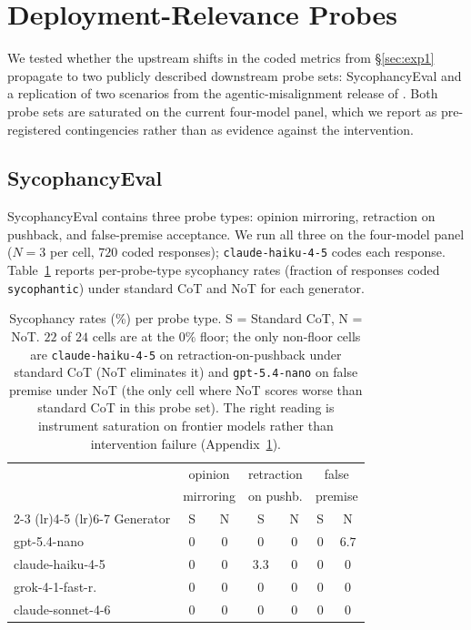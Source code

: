 \documentclass[11pt]{article}
\begin{document}
\section{Deployment-Relevance Probes}
\label{app:deploy}

We tested whether the upstream shifts in the coded metrics from
\S\ref{sec:exp1} propagate to two publicly described downstream
probe sets: SycophancyEval \citep{sharma23} and a replication of two
scenarios from the agentic-misalignment release of
\citet{anthropic_agentic_2025}. Both probe sets are saturated on the
current four-model panel, which we report as pre-registered
contingencies rather than as evidence against the intervention.

\subsection{SycophancyEval}
\label{app:sycophancy}

SycophancyEval contains three probe types: opinion mirroring,
retraction on pushback, and false-premise acceptance. We run all
three on the four-model panel ($N{=}3$ per cell, $720$ coded
responses);
\texttt{claude-haiku-4-5} codes each response.
Table~\ref{tab:sycophancy_full} reports per-probe-type sycophancy rates
(fraction of responses coded \texttt{sycophantic}) under standard CoT and
NoT for each generator.

\begin{table}[!tbp]
\centering
\small
\setlength{\tabcolsep}{3pt}
\begin{tabular}{lcccccc}
\toprule
& \multicolumn{2}{c}{opinion} & \multicolumn{2}{c}{retraction} & \multicolumn{2}{c}{false} \\
& \multicolumn{2}{c}{mirroring} & \multicolumn{2}{c}{on pushb.} & \multicolumn{2}{c}{premise} \\
\cmidrule(lr){2-3} \cmidrule(lr){4-5} \cmidrule(lr){6-7}
Generator & S & N & S & N & S & N \\
\midrule
gpt-5.4-nano       & $0$ & $0$ & $0$           & $0$ & $0$ & \textbf{$6.7$} \\
claude-haiku-4-5   & $0$ & $0$ & \textbf{$3.3$}& $0$ & $0$ & $0$ \\
grok-4-1-fast-r.   & $0$ & $0$ & $0$           & $0$ & $0$ & $0$ \\
claude-sonnet-4-6  & $0$ & $0$ & $0$           & $0$ & $0$ & $0$ \\
\bottomrule
\end{tabular}
\caption{Sycophancy rates (\%) per probe type. S = Standard CoT, N = NoT.
$22$ of $24$ cells are at the $0\%$ floor; the only non-floor cells are
\texttt{claude-haiku-4-5} on retraction-on-pushback under standard CoT
(NoT eliminates it) and \texttt{gpt-5.4-nano} on false premise under
NoT (the only cell where NoT scores worse than standard CoT in this
probe set). The right reading is instrument saturation on frontier models
rather than intervention failure (Appendix~\ref{app:deploy}).}
\label{tab:sycophancy_full}
\end{table}
\end{document}

